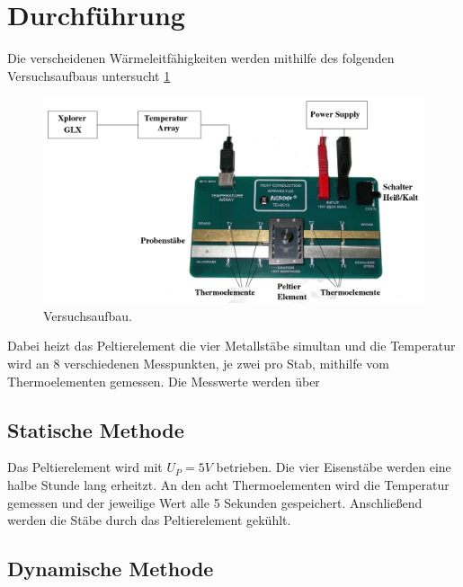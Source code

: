 \section{Durchführung}
\label{sec:Durchführung}
Die verscheidenen Wärmeleitfähigkeiten werden mithilfe des folgenden Versuchsaufbaus
untersucht \ref{fig:aufbau}
\begin{figure}
\centering
\includegraphics[width=\textwidth]{content/aufbau.png}
\caption{Versuchsaufbau.}
\label{fig:aufbau}
\end{figure}
Dabei heizt das Peltierelement die vier Metallstäbe simultan und die Temperatur wird an 8
verschiedenen Messpunkten, je zwei pro Stab, mithilfe vom Thermoelementen gemessen. Die
Messwerte werden über

\subsection{Statische Methode}
\label{sec:statische Methode}
Das Peltierelement wird mit $U_P=5V$ betrieben.
Die vier Eisenstäbe werden eine halbe Stunde lang erheitzt.
An den acht Thermoelementen wird die Temperatur gemessen und der jeweilige Wert alle 5 Sekunden gespeichert.
Anschließend werden die Stäbe durch das Peltierelement gekühlt.


\subsection{Dynamische Methode}
\label{sec:dynamische Methode}

